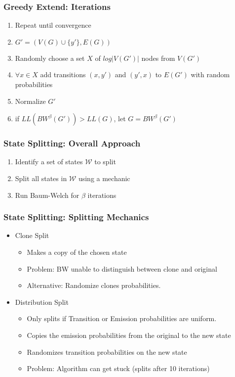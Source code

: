 \begin{frame}
  \frametitle{Greedy Extend: Iterations} 
  
	\begin{enumerate}
		\item Repeat until convergence
		\item $G' = (V(G) \cup \{y'\}, E(G))$ 
		\item Randomly choose a set $X$ of $log \vert V(G') \vert$ nodes from $V(G')$ 
		\item $\forall x \in X$ add transitions $(x,y')$ and $(y',x)$ to $E(G')$ with random probabilities
		\item Normalize $G'$
		\item if $LL(BW^\beta(G')) > LL(G)$, let $G = BW^\beta(G')$
	\end{enumerate}

  
\end{frame}


\begin{frame}
  \frametitle{State Splitting: Overall Approach} 
  \begin{enumerate}
  	\item Identify a set of states $\mathcal{W}$ to split
  	\item Split all states in $\mathcal{W}$ using a mechanic
  	\item Run Baum-Welch for $\beta$ iterations
  \end{enumerate}
     
\end{frame}



\begin{frame}
  \frametitle{State Splitting: Splitting Mechanics} 
  \begin{itemize}
  	\item Clone Split
  		\begin{itemize}
  			\item Makes a copy of the chosen state
  			\item Problem: BW unable to distinguish between clone and original
  			\item Alternative: Randomize clones probabilities.
  		\end{itemize}
  	\item Distribution Split
  		\begin{itemize}
  			\item Only splits if Transition or Emission probabilities are uniform.
  			\item Copies the emission probabilities from the original to the new state 
  			\item Randomizes transition probabilities on the new state
  			\item Problem: Algorithm can get stuck (splits after 10 iterations)
  		\end{itemize}
  \end{itemize}
  
\end{frame}

